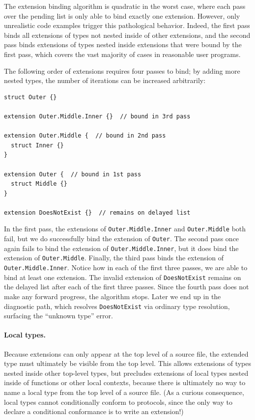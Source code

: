 \documentclass[../generics]{subfiles}
\begin{document}
The extension binding algorithm is quadratic in the worst case, where each pass over the pending list is only able to bind exactly one extension. However, only unrealistic code examples trigger this pathological behavior. Indeed, the first pass binds all extensions of types not nested inside of other extensions, and the second pass binds extensions of types nested inside extensions that were bound by the first pass, which covers the vast majority of cases in reasonable user programs.

\begin{example}
The following order of extensions requires four passes to bind; by adding more nested types, the number of iterations can be increased arbitrarily:
\begin{Verbatim}
struct Outer {}

extension Outer.Middle.Inner {}  // bound in 3rd pass

extension Outer.Middle {  // bound in 2nd pass
  struct Inner {}
}

extension Outer {  // bound in 1st pass
  struct Middle {}
}

extension DoesNotExist {}  // remains on delayed list
\end{Verbatim}

In the first pass, the extensions of \texttt{Outer.Middle.Inner} and \texttt{Outer.Middle} both fail, but we do successfully bind the extension of \texttt{Outer}. The second pass once again fails to bind the extension of \texttt{Outer.Middle.Inner}, but it does bind the extension of \texttt{Outer.Middle}. Finally, the third pass binds the extension of \texttt{Outer.Middle.Inner}. Notice how in each of the first three passes, we are able to bind at least one extension. The invalid extension of \texttt{DoesNotExist} remains on the delayed list after each of the first three passes. Since the fourth pass does not make any forward progress, the algorithm stops. Later we end up in the diagnostic path, which resolves \texttt{DoesNotExist} via ordinary type resolution, surfacing the ``unknown type'' error.
\end{example}

\paragraph{Local types.}
Because extensions can only appear at the top level of a source file, the extended type must ultimately be visible from the top level. This allows extensions of types nested inside other top-level types, but precludes extensions of local types nested inside of functions or other local contexts, because there is ultimately no way to name a local type from the top level of a source file. (As a curious consequence, local types cannot conditionally conform to protocols, since the only way to declare a conditional conformance is to write an extension!)
\end{document}
